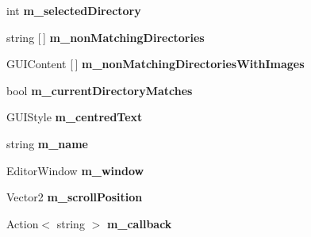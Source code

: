 \begin{DoxyCompactItemize}
int {\bfseries m\+\_\+selected\+Directory}
\item 
\mbox{\label{class_lerp2_a_p_i_editor_1_1_utility_1_1_file_browser_editor_ae6a311178a8deeeabfbba84f0dd22e99}} 
string \mbox{[}$\,$\mbox{]} {\bfseries m\+\_\+non\+Matching\+Directories}
\item 
\mbox{\label{class_lerp2_a_p_i_editor_1_1_utility_1_1_file_browser_editor_ab9929887fe099addb00c6f987d92e232}} 
G\+U\+I\+Content \mbox{[}$\,$\mbox{]} {\bfseries m\+\_\+non\+Matching\+Directories\+With\+Images}
\item 
\mbox{\label{class_lerp2_a_p_i_editor_1_1_utility_1_1_file_browser_editor_a2ae4d2b115e4b9e4f64ed620a7986dc7}} 
bool {\bfseries m\+\_\+current\+Directory\+Matches}
\item 
\mbox{\label{class_lerp2_a_p_i_editor_1_1_utility_1_1_file_browser_editor_ac805ca3a07179e639c7d64cca248c330}} 
G\+U\+I\+Style {\bfseries m\+\_\+centred\+Text}
\item 
\mbox{\label{class_lerp2_a_p_i_editor_1_1_utility_1_1_file_browser_editor_a1896ff88f56524f544971c05e8002001}} 
string {\bfseries m\+\_\+name}
\item 
\mbox{\label{class_lerp2_a_p_i_editor_1_1_utility_1_1_file_browser_editor_a5174e50ca24cab7adee6a6eb5602a0cf}} 
Editor\+Window {\bfseries m\+\_\+window}
\item 
\mbox{\label{class_lerp2_a_p_i_editor_1_1_utility_1_1_file_browser_editor_a4a4bf3bd81cc8a63433c4756a3d3a4d6}} 
Vector2 {\bfseries m\+\_\+scroll\+Position}
\item 
\mbox{\label{class_lerp2_a_p_i_editor_1_1_utility_1_1_file_browser_editor_a2ded1ad1067ba05375edec5ec85c82a4}} 
Action$<$ string $>$ {\bfseries m\+\_\+callback}
\end{DoxyCompactItemize}
